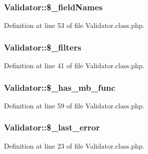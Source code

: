 \subsubsection[{\$\+\_\+field\+Names}]{\setlength{\rightskip}{0pt plus 5cm}Validator\+::\$\+\_\+field\+Names}\label{classValidator_a5689ec4c9687c826fc82902fa9b662d8}


Definition at line 53 of file Validator.\+class.\+php.

\hypertarget{classValidator_ab86eb87cb828002c10d06be613d7b013}{}
\subsubsection[{\$\+\_\+filters}]{\setlength{\rightskip}{0pt plus 5cm}Validator\+::\$\+\_\+filters}\label{classValidator_ab86eb87cb828002c10d06be613d7b013}


Definition at line 41 of file Validator.\+class.\+php.

\hypertarget{classValidator_a8ac5ee1cf7a5ba237ee40c61a5d834c1}{}
\subsubsection[{\$\+\_\+has\+\_\+mb\+\_\+func}]{\setlength{\rightskip}{0pt plus 5cm}Validator\+::\$\+\_\+has\+\_\+mb\+\_\+func}\label{classValidator_a8ac5ee1cf7a5ba237ee40c61a5d834c1}


Definition at line 59 of file Validator.\+class.\+php.

\hypertarget{classValidator_a1b957a11848d8cb550fc578052f49588}{}
\subsubsection[{\$\+\_\+last\+\_\+error}]{\setlength{\rightskip}{0pt plus 5cm}Validator\+::\$\+\_\+last\+\_\+error}\label{classValidator_a1b957a11848d8cb550fc578052f49588}


Definition at line 23 of file Validator.\+class.\+php.

\hypertarget{classValidator_ac9f1f384dc723b2a4581e83066fba49c}{}
